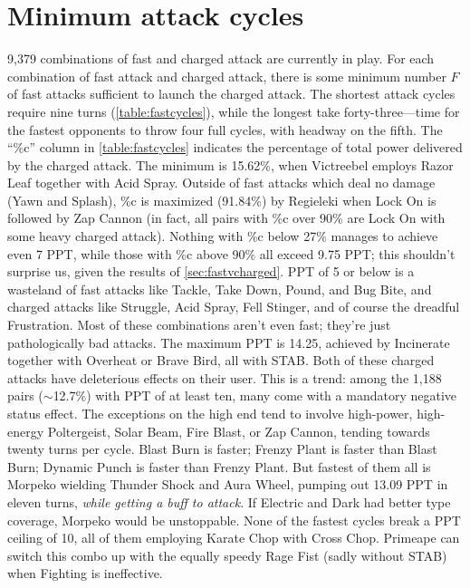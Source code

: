 \section{Minimum attack cycles}
9,379 combinations of fast and charged attack are currently in play.
For each combination of fast attack and charged attack, there is some minimum number
 $F$ of fast attacks sufficient to launch the charged attack.
The shortest attack cycles require nine turns (\autoref{table:fastcycles}),
 while the longest take forty-three---time for the fastest opponents to
 throw four full cycles, with headway on the fifth.
The ``\%c'' column in \autoref{table:fastcycles} indicates the percentage of total
 power delivered by the charged attack.
The minimum is 15.62\%, when Victreebel employs Razor Leaf together with Acid Spray.
Outside of fast attacks which deal no damage (Yawn and Splash), \%c is maximized (91.84\%)
 by Regieleki when Lock On is followed by Zap Cannon
 (in fact, all pairs with \%c over 90\% are Lock On with some heavy charged attack).
Nothing with \%c below 27\% manages to achieve even 7 PPT, while
 those with \%c above 90\% all exceed 9.75 PPT; this shouldn't surprise
 us, given the results of \autoref{sec:fastvcharged}.
PPT of 5 or below is a wasteland of fast attacks like Tackle, Take Down, Pound, and Bug Bite,
 and charged attacks like Struggle, Acid Spray, Fell Stinger, and of course the dreadful Frustration.
Most of these combinations aren't even fast; they're just pathologically bad attacks.
The maximum PPT is 14.25, achieved by Incinerate together with Overheat or Brave Bird, all with STAB.
Both of these charged attacks have deleterious effects on their user.
This is a trend: among the 1,188 pairs ($\sim$12.7\%) with PPT of at least ten,
 many come with a mandatory negative status effect.
The exceptions on the high end tend to involve high-power, high-energy Poltergeist, Solar Beam, Fire Blast, or Zap Cannon,
 tending towards twenty turns per cycle.
Blast Burn is faster; Frenzy Plant is faster than Blast Burn; Dynamic Punch is faster than Frenzy Plant.
But fastest of them all is Morpeko wielding Thunder Shock and Aura Wheel, pumping out 13.09 PPT
 in eleven turns, \textit{while getting a buff to attack}.
If Electric and Dark had better type coverage, Morpeko would be unstoppable.
None of the fastest cycles break a PPT ceiling of 10, all of them employing Karate Chop with Cross Chop.
Primeape can switch this combo up with the equally speedy Rage Fist (sadly without STAB)
 when Fighting is ineffective.




